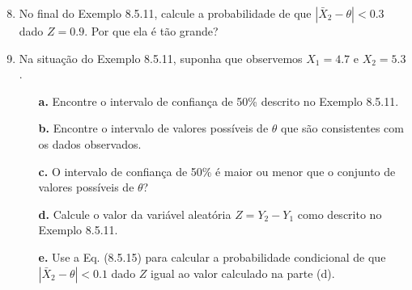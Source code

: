 \begin{enumerate}
    \setcounter{enumi}{7} %
    \item No final do Exemplo 8.5.11, calcule a probabilidade de que $|\bar{X}_2 - \theta| < 0.3$ dado $Z=0.9$. Por que ela é tão grande?

    \item Na situação do Exemplo 8.5.11, suponha que observemos $X_1 = 4.7$ e $X_2 = 5.3$.
    \begin{enumerate}
        \item[\textbf{a.}] Encontre o intervalo de confiança de 50\% descrito no Exemplo 8.5.11.
        \item[\textbf{b.}] Encontre o intervalo de valores possíveis de $\theta$ que são consistentes com os dados observados.
        \item[\textbf{c.}] O intervalo de confiança de 50\% é maior ou menor que o conjunto de valores possíveis de $\theta$?
        \item[\textbf{d.}] Calcule o valor da variável aleatória $Z = Y_2 - Y_1$ como descrito no Exemplo 8.5.11.
        \item[\textbf{e.}] Use a Eq. (8.5.15) para calcular a probabilidade condicional de que $|\bar{X}_2 - \theta| < 0.1$ dado $Z$ igual ao valor calculado na parte (d).
    \end{enumerate}
\end{enumerate}

